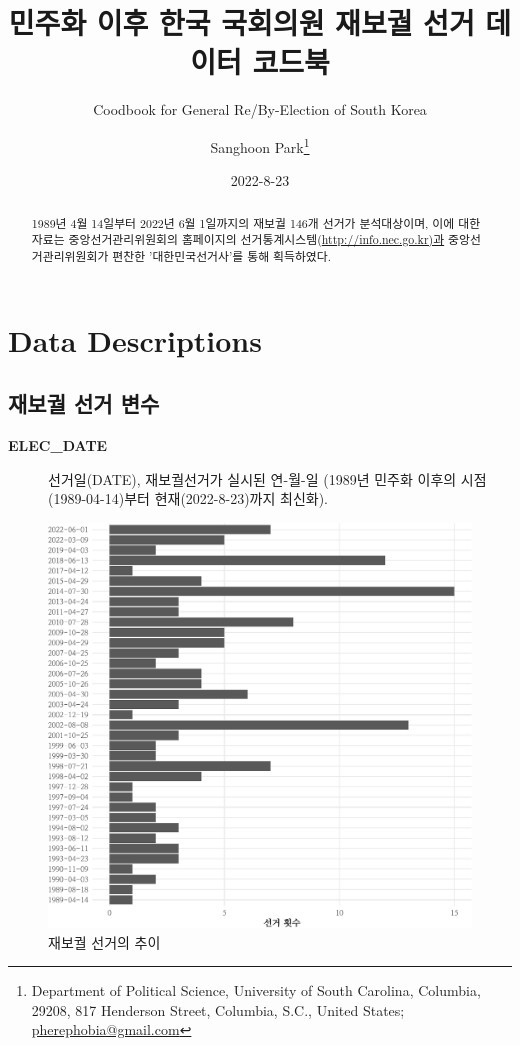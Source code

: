 \documentclass[
  11pt,
  letter]{article}
\title{\Large \bf 민주화 이후 한국 국회의원 재보궐 선거 데이터 코드북}
\subtitle{\large Coodbook for General Re/By-Election of South Korea}
\author{Sanghoon Park\footnote{Department of Political Science,
  University of South Carolina, Columbia, 29208, 817 Henderson Street,
  Columbia, S.C., United States; \url{pherephobia@gmail.com}}}
\date{2022-8-23}
\begin{document}
\maketitle
\begin{abstract}
\noindent 1989년 4월 14일부터 2022년 6월 1일까지의 재보궐 146개 선거가
분석대상이며, 이에 대한 자료는 중앙선거관리위원회의 홈페이지의
선거통계시스템(\url{http://info.nec.go.kr)과} 중앙선거관리위원회가
편찬한 '대한민국선거사'를 통해 획득하였다.
\end{abstract}

{
\setcounter{tocdepth}{3}
\tableofcontents
}
\clearpage
\newpage

\hypertarget{data-descriptions}{%
\section{Data Descriptions}\label{data-descriptions}}

\hypertarget{uxc7acuxbcf4uxad90-uxc120uxac70-uxbcc0uxc218}{%
\subsection{재보궐 선거
변수}\label{uxc7acuxbcf4uxad90-uxc120uxac70-uxbcc0uxc218}}

\begin{description}
\item[\textbf{ELEC\_DATE}]
선거일(DATE), 재보궐선거가 실시된 연-월-일 (1989년 민주화 이후의
시점(1989-04-14)부터 현재(2022-8-23)까지 최신화).
\end{description}

\begin{figure}
\centering
\includegraphics{Codebook_national_files/figure-latex/unnamed-chunk-1-1.pdf}
\caption{재보궐 선거의 추이}
\end{figure}
\end{document}
